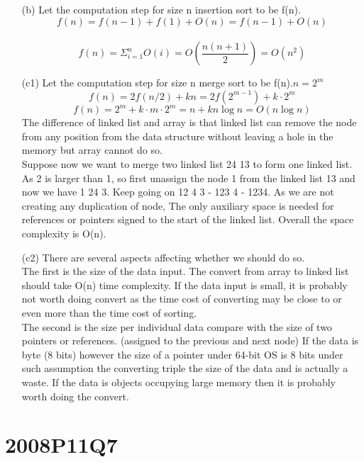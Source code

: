 \documentclass[10pt,twoside,a4paper]{article}
\begin{document}
\begin{itemize}
\item[(b)]
Let the computation step for size n insertion sort to be f(n).\\
$$f(n)=f(n-1)+f(1)+O(n)=f(n-1)+O(n)$$\\
$$f(n)=\Sigma_{i=1}^{n}{O(i)}=O(\frac{n(n+1)}{2})=O(n^2)$$
\item[(c1)]
Let the computation step for size n merge sort to be f(n).$n=2^m$\\
$$f(n)=2f(n/2)+kn=2f(2^{m-1})+k\cdot 2^m$$
$$f(n)=2^m+k\cdot m\cdot 2^m=n+kn\log n=O(n\log n)$$
The difference of linked list and array is that linked list can remove the node from any position from the data structure without leaving a hole in the memory but array cannot do so.\\
Suppose now we want to merge two linked list 24 13 to form one linked list. As 2 is larger than 1, so first unassign the node 1 from the linked list 13 and now we have 1 24 3. Keep going on 12 4 3 - 123 4 - 1234. As we are not creating any duplication of node, The only auxiliary space is needed for references or pointers signed to the start of the linked list. Overall the space complexity is O(n).
\item[(c2)]
There are several aspects affecting whether we should do so.\\
The first is the size of the data input. The convert from array to linked list should take O(n) time complexity. If the data input is small, it is probably not worth doing convert as the time cost of converting may be close to or even more than the time cost of sorting.\\
The second is the size per individual data compare with the size of two pointers or references. (assigned to the previous and next node) If the data is byte (8 bits) however the size of a pointer under 64-bit OS is 8 bits under such assumption the converting triple the size of the data and is actually a waste. If the data is objects occupying large memory then it is probably worth doing the convert.

\end{itemize}

\section{2008P11Q7}
\end{document}
